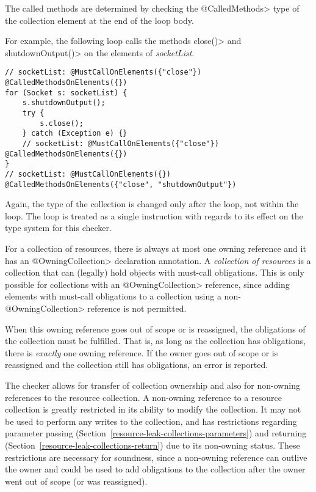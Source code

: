The called methods are
determined by checking the \<@CalledMethods> type of the collection element at
the end of the loop body.

For example, the following loop calls the methods \<close()> and \<shutdownOutput()> on the elements of \textit{socketList}.

\begin{verbatim}
// socketList: @MustCallOnElements({"close"}) @CalledMethodsOnElements({})
for (Socket s: socketList) {
    s.shutdownOutput();
    try {
        s.close();
    } catch (Exception e) {}
    // socketList: @MustCallOnElements({"close"}) @CalledMethodsOnElements({})
}
// socketList: @MustCallOnElements({}) @CalledMethodsOnElements({"close", "shutdownOutput"})
\end{verbatim}

Again, the type of the collection is changed only after the loop, not within the
loop. The loop is treated as a single instruction with regards to its effect on
the type system for this checker.

For a collection of resources, there is always at most one owning reference and it has an \<@OwningCollection> declaration annotation. A \textit{collection of resources} is a collection that can (legally) hold objects with must-call obligations. This is only possible for collections with an \<@OwningCollection> reference, since adding elements with must-call obligations to a collection using a non-\<@OwningCollection> reference is not permitted.

When this owning reference goes out of scope or is reassigned, the obligations of the collection must be fulfilled. That is, as long as the collection has obligations, there is \textit{exactly} one owning reference. If the owner goes out of scope or is reassigned and the collection still has obligations, an error is reported.

The checker allows for transfer of collection ownership and also for non-owning references to the resource collection. A non-owning reference to a resource collection is greatly restricted in its ability to modify the collection. It may not be used to perform any writes to the collection, and has restrictions regarding parameter passing (Section~\ref{resource-leak-collections-parameters}) and returning (Section~\ref{resource-leak-collections-return}) due to its non-owning status. These restrictions are necessary for soundness, since a non-owning reference can outlive the owner and could be used to add obligations to the collection after the owner went out of scope (or was reassigned).

